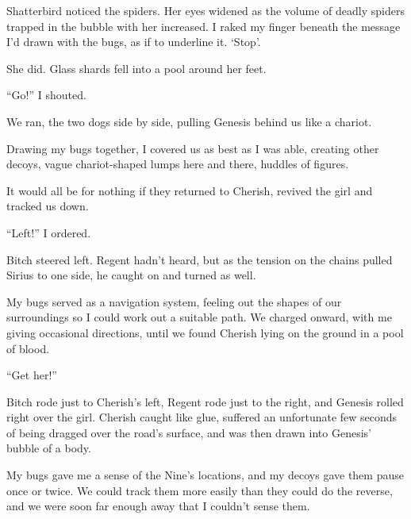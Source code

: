Shatterbird noticed the spiders.  Her eyes widened as the volume of deadly spiders trapped in the bubble with her increased.  I raked my finger beneath the message I'd drawn with the bugs, as if to underline it.  `Stop'.



She did.  Glass shards fell into a pool around her feet.



``Go!''  I shouted.



We ran, the two dogs side by side, pulling Genesis behind us like a chariot.



Drawing my bugs together, I covered us as best as I was able, creating other decoys, vague chariot-shaped lumps here and there, huddles of figures.



It would all be for nothing if they returned to Cherish, revived the girl and tracked us down.



``Left!'' I ordered.



Bitch steered left.  Regent hadn't heard, but as the tension on the chains pulled Sirius to one side, he caught on and turned as well.



My bugs served as a navigation system, feeling out the shapes of our surroundings so I could work out a suitable path.  We charged onward, with me giving occasional directions, until we found Cherish lying on the ground in a pool of blood.



``Get her!''



Bitch rode just to Cherish's left, Regent rode just to the right, and Genesis rolled right over the girl.  Cherish caught like glue, suffered an unfortunate few seconds of being dragged over the road's surface, and was then drawn into Genesis' bubble of a body.



My bugs gave me a sense of the Nine's locations, and my decoys gave them pause once or twice.  We could track them more easily than they could do the reverse, and we were soon far enough away that I couldn't sense them.



\blacksquare



